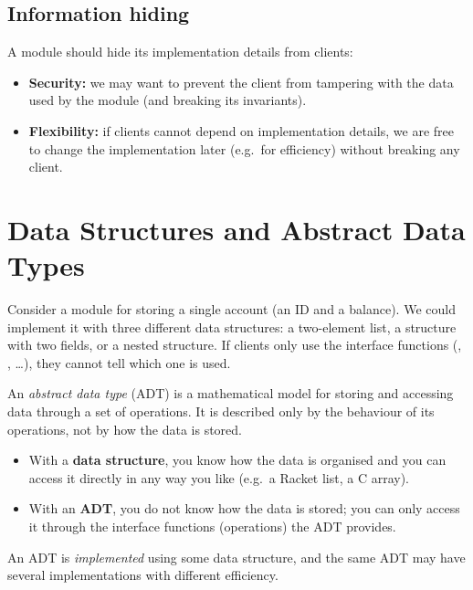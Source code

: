 \subsection{Information hiding}

A module should hide its implementation details from clients:
\begin{itemize}
  \item \textbf{Security:} we may want to prevent the client from tampering with the data
    used by the module (and breaking its invariants).
  \item \textbf{Flexibility:} if clients cannot depend on implementation details, we are free
    to change the implementation later (e.g.\ for efficiency) without breaking any client.
\end{itemize}

\section{Data Structures and Abstract Data Types}

Consider a module for storing a single account (an ID and a balance). We could implement it
with three different data structures: a two-element list, a structure with two fields, or a
nested structure. If clients only use the interface functions (,
, \dots), they cannot tell which one is used.

\begin{definition}
An \emph{abstract data type} (ADT) is a mathematical model for storing and accessing data
through a set of operations. It is described only by the behaviour of its operations, not by
how the data is stored.
\end{definition}

\begin{important}
\begin{itemize}
  \item With a \textbf{data structure}, you know how the data is organised and you can access it
    directly in any way you like (e.g.\ a Racket list, a C array).
  \item With an \textbf{ADT}, you do not know how the data is stored; you can only access it
    through the interface functions (operations) the ADT provides.
\end{itemize}
An ADT is \emph{implemented} using some data structure, and the same ADT may have several
implementations with different efficiency.
\end{important}


